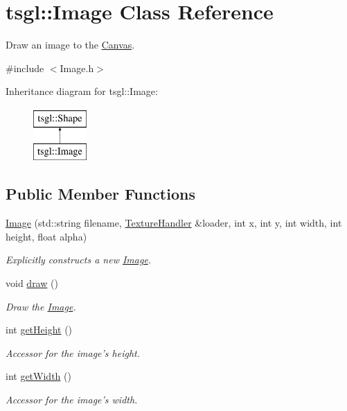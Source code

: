 \hypertarget{classtsgl_1_1_image}{\section{tsgl\-:\-:\-Image \-Class \-Reference}
\label{classtsgl_1_1_image}
}


\-Draw an image to the \hyperlink{classtsgl_1_1_canvas}{\-Canvas}.  




{\ttfamily \#include $<$\-Image.\-h$>$}

\-Inheritance diagram for tsgl\-:\-:\-Image\-:\begin{figure}[H]
\begin{center}
\leavevmode
\includegraphics[height=2.000000cm]{classtsgl_1_1_image}
\end{center}
\end{figure}
\subsection*{\-Public \-Member \-Functions}
\begin{DoxyCompactItemize}
\item 
\hyperlink{classtsgl_1_1_image_a497894a4dbfa46d1e3aefd7dbe086cc3}{\-Image} (std\-::string filename, \hyperlink{classtsgl_1_1_texture_handler}{\-Texture\-Handler} \&loader, int x, int y, int width, int height, float alpha)
\begin{DoxyCompactList}\small\item\em \-Explicitly constructs a new \hyperlink{classtsgl_1_1_image}{\-Image}. \end{DoxyCompactList}\item 
void \hyperlink{classtsgl_1_1_image_a85732de312b98dd5ce5a9cc319bbf8c5}{draw} ()
\begin{DoxyCompactList}\small\item\em \-Draw the \hyperlink{classtsgl_1_1_image}{\-Image}. \end{DoxyCompactList}\item 
int \hyperlink{classtsgl_1_1_image_afa939262dcf32c9a504efe30a8de5c58}{get\-Height} ()
\begin{DoxyCompactList}\small\item\em \-Accessor for the image's height. \end{DoxyCompactList}\item 
int \hyperlink{classtsgl_1_1_image_af01d5f815b91f20fd441f9bcec671d79}{get\-Width} ()
\begin{DoxyCompactList}\small\item\em \-Accessor for the image's width. \end{DoxyCompactList}\end{DoxyCompactItemize}


